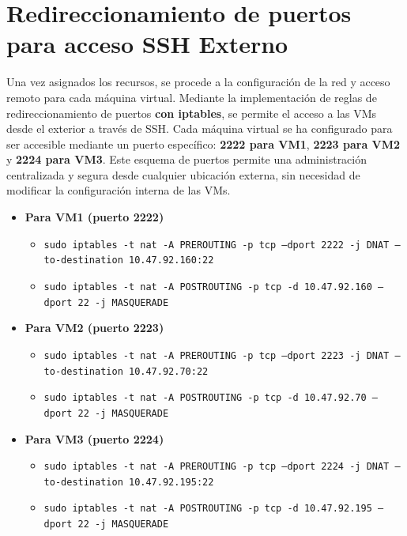 \section{Redireccionamiento de puertos para acceso SSH Externo}

Una vez asignados los recursos, se procede a la configuración de la red y acceso remoto para cada máquina virtual. Mediante la implementación de reglas de redireccionamiento de puertos \textbf{con iptables}, se permite el acceso a las VMs desde el exterior a través de SSH. Cada máquina virtual se ha configurado para ser accesible mediante un puerto específico: \textbf{2222 para VM1}, \textbf{2223 para VM2} y \textbf{2224 para VM3}. Este esquema de puertos permite una administración centralizada y segura desde cualquier ubicación externa, sin necesidad de modificar la configuración interna de las VMs.

\begin{itemize}
    \item \textbf{Para VM1 (puerto 2222)}
    \begin{itemize}
        \item \texttt{sudo iptables -t nat -A PREROUTING -p tcp --dport 2222 -j \newline
        DNAT --to-destination 10.47.92.160:22}
        
        \item \texttt{sudo iptables -t nat -A POSTROUTING -p tcp -d 10.47.92.160 \newline
        --dport 22 -j MASQUERADE}
    \end{itemize}
    
    \item \textbf{Para VM2 (puerto 2223)}
    \begin{itemize}
        \item \texttt{sudo iptables -t nat -A PREROUTING -p tcp --dport 2223 -j \newline
        DNAT --to-destination 10.47.92.70:22}
        
        \item \texttt{sudo iptables -t nat -A POSTROUTING -p tcp -d 10.47.92.70 \newline
        --dport 22 -j MASQUERADE}
    \end{itemize}
    
    \item \textbf{Para VM3 (puerto 2224)}
    \begin{itemize}
        \item \texttt{sudo iptables -t nat -A PREROUTING -p tcp --dport 2224 -j \newline
        DNAT --to-destination 10.47.92.195:22}
        
        \item \texttt{sudo iptables -t nat -A POSTROUTING -p tcp -d 10.47.92.195 \newline
        --dport 22 -j MASQUERADE}
    \end{itemize}
\end{itemize}


